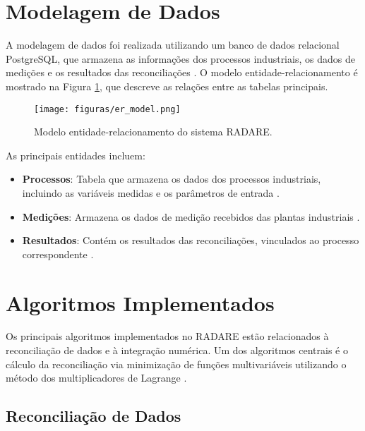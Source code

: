 \section{Modelagem de Dados}
\label{Sec:ModelagemDados}

A modelagem de dados foi realizada utilizando um banco de dados relacional PostgreSQL, que armazena as informações dos processos industriais, os dados de medições e os resultados das reconciliações \cite{postgres2024}. O modelo entidade-relacionamento é mostrado na Figura \ref{Fig:ERModel}, que descreve as relações entre as tabelas principais.

\begin{figure}[htbp]
    \centering
    \texttt{[image: figuras/er\_model.png]}
    \caption{Modelo entidade-relacionamento do sistema RADARE.}
    \label{Fig:ERModel}
\end{figure}

As principais entidades incluem:

\begin{itemize}
    \item \textbf{Processos}: Tabela que armazena os dados dos processos industriais, incluindo as variáveis medidas e os parâmetros de entrada \cite{processdata2024}.
    \item \textbf{Medições}: Armazena os dados de medição recebidos das plantas industriais \cite{measurementdata2024}.
    \item \textbf{Resultados}: Contém os resultados das reconciliações, vinculados ao processo correspondente \cite{reconciliationresults2024}.
\end{itemize}

\section{Algoritmos Implementados}
\label{Sec:AlgoritmosImplementados}

Os principais algoritmos implementados no RADARE estão relacionados à reconciliação de dados e à integração numérica. Um dos algoritmos centrais é o cálculo da reconciliação via minimização de funções multivariáveis utilizando o método dos multiplicadores de Lagrange \cite{lagrangealgorithm2024}.

\subsection{Reconciliação de Dados}
\label{Sec:ReconciliaçãoDados}


